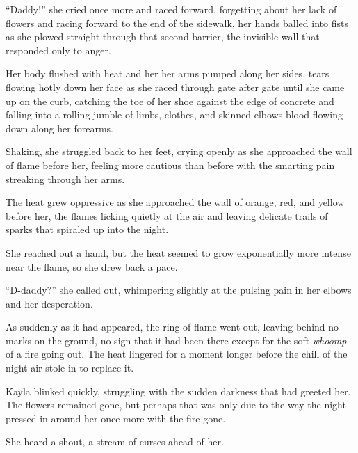 ``Daddy!'' she cried once more and raced forward, forgetting about her lack of flowers and racing forward to the end of the sidewalk, her hands balled into fists as she plowed straight through that second barrier, the invisible wall that responded only to anger.

Her body flushed with heat and her her arms pumped along her sides, tears flowing hotly down her face as she raced through gate after gate until she came up on the curb, catching the toe of her shoe against the edge of concrete and falling into a rolling jumble of limbs, clothes, and skinned elbows blood flowing down along her forearms.

Shaking, she struggled back to her feet, crying openly as she approached the wall of flame before her, feeling more cautious than before with the smarting pain streaking through her arms.

The heat grew oppressive as she approached the wall of orange, red, and yellow before her, the flames licking quietly at the air and leaving delicate trails of sparks that spiraled up into the night.

She reached out a hand, but the heat seemed to grow exponentially more intense near the flame, so she drew back a pace.

``D-daddy?'' she called out, whimpering slightly at the pulsing pain in her elbows and her desperation.

As suddenly as it had appeared, the ring of flame went out, leaving behind no marks on the ground, no sign that it had been there except for the soft \textit{whoomp} of a fire going out.  The heat lingered for a moment longer before the chill of the night air stole in to replace it.

Kayla blinked quickly, struggling with the sudden darkness that had greeted her.  The flowers remained gone, but perhaps that was only due to the way the night pressed in around her once more with the fire gone.

She heard a shout, a stream of curses ahead of her.  
